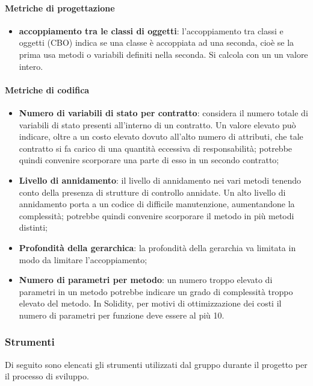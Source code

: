 \begin{itemize}
		\paragraph{Metriche di progettazione}
		\begin{itemize}
			\item \textbf{accoppiamento tra le classi di oggetti}:
			l'accoppiamento tra classi e oggetti (CBO) indica se una classe è accoppiata ad una seconda, cioè se la prima usa metodi o variabili definiti nella seconda. Si calcola con un un valore intero.
		\end{itemize}
		\paragraph{Metriche di codifica}
			\begin{itemize}
				\item \textbf{Numero di variabili di stato per contratto}: considera il numero totale di variabili di stato presenti all'interno di un contratto. Un valore elevato può indicare, oltre a un costo elevato dovuto all'alto numero di attributi, che tale contratto si fa carico di una quantità eccessiva di responsabilità; potrebbe quindi convenire scorporare una parte di esso in un secondo contratto;
				\item \textbf{Livello di annidamento}: il livello di annidamento nei vari metodi tenendo	conto della presenza di strutture di controllo annidate.  Un alto livello di annidamento porta a un codice di difficile manutenzione, aumentandone la complessità; potrebbe quindi convenire scorporare il metodo in più metodi distinti;
				\item \textbf{Profondità della gerarchica}: la profondità della gerarchia va limitata in modo da limitare l'accoppiamento;
				\item \textbf{Numero di parametri per metodo}: un numero troppo elevato di parametri in un metodo potrebbe indicare un grado di complessità troppo elevato del metodo. In Solidity\glo, per motivi di ottimizzazione dei costi il numero di parametri per funzione deve essere al più 10.
			\end{itemize}
			
	\subsubsection{Strumenti}
	Di seguito sono elencati gli strumenti utilizzati dal gruppo durante il 
	progetto per il processo di sviluppo.
			

\end{itemize}
